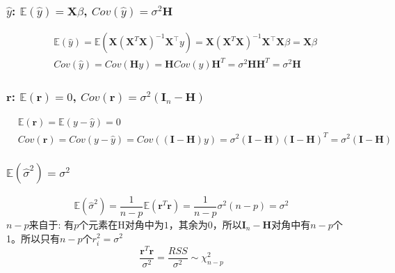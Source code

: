 \documentclass[11pt,a4paper]{article}
\begin{document}
\subsubsection{$\hat{y}$: $\mathbb{E}(\hat{y})=\mathbf{X}\beta$, $Cov(\hat{y})=\sigma^2 \mathbf{H}$}
\begin{equation}
    \begin{aligned}
        &\mathbb{E}(\hat{y})=\mathbb{E}(\mathbf{X}\left(\mathbf{X}^{T} \mathbf{X}\right)^{-1} \mathbf{X}^{\top}y)=\mathbf{X}\left(\mathbf{X}^{T} \mathbf{X}\right)^{-1} \mathbf{X}^{\top}\mathbf{X}\beta=\mathbf{X}\beta\\
        &Cov(\hat{y})=Cov(\mathbf{H}y)=\mathbf{H}Cov(y)\mathbf{H}^T=\sigma^2\mathbf{H}\mathbf{H}^T=\sigma^2\mathbf{H}
    \end{aligned}
    \nonumber
\end{equation}
\subsubsection{$\mathbf{r}$: $\mathbb{E}(\mathbf{r})=0$, $Cov(\mathbf{r})=\sigma^2 (\mathbf{I}_n-\mathbf{H})$}
\begin{equation}
    \begin{aligned}
        &\mathbb{E}(\mathbf{r})=\mathbb{E}(y-\hat{y})=0\\
        &Cov(\mathbf{r})=Cov(y-\hat{y})=Cov((\mathbf{I}-\mathbf{H})y)=\sigma^2(\mathbf{I}-\mathbf{H})(\mathbf{I}-\mathbf{H})^T=\sigma^2(\mathbf{I}-\mathbf{H})
    \end{aligned}
    \nonumber
\end{equation}
\subsubsection{$\mathbb{E}(\hat{\sigma}^2)=\sigma^2$}
$$\mathbb{E}(\hat{\sigma}^2)=\frac{1}{n-p}\mathbb{E}(\mathbf{r}^T \mathbf{r})=\frac{1}{n-p}\sigma^2(n-p)=\sigma^2$$
$n-p$来自于: 有$p$个元素在H对角中为$1$，其余为$0$，所以$\mathbf{I}_n-\mathbf{H}$对角中有$n-p$个1。所以只有$n-p$个$r_i^2=\sigma^2$
$$\frac{\mathbf{r}^T \mathbf{r}}{\sigma^2}=\frac{RSS}{\sigma^2}\sim \chi^2_{n-p}$$
\end{document}
